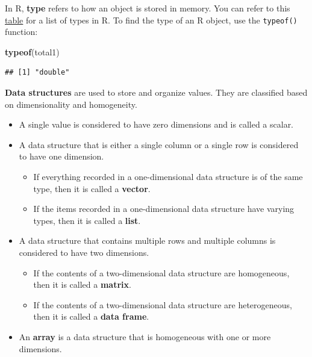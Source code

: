 \documentclass[
]{book}
\newenvironment{Shaded}{\begin{snugshade}}{\end{snugshade}}
\newcommand{\FunctionTok}[1]{\textcolor[rgb]{0.13,0.29,0.53}{\textbf{#1}}}
\newcommand{\NormalTok}[1]{#1}
\providecommand{\tightlist}{%
  \setlength{\itemsep}{0pt}\setlength{\parskip}{0pt}}
\theoremstyle{definition}
\theoremstyle{definition}
\theoremstyle{definition}
\theoremstyle{definition}
\theoremstyle{remark}
\begin{document}
In R, \textbf{type} refers to how an object is stored in memory. You can refer to this \href{https://cran.r-project.org/doc/manuals/r-patched/R-lang.html\#Objects}{table} for a list of types in R. To find the type of an R object, use the \texttt{typeof()} function:

\begin{Shaded}
\begin{Highlighting}[]
\FunctionTok{typeof}\NormalTok{(total1)}
\end{Highlighting}
\end{Shaded}

\begin{verbatim}
## [1] "double"
\end{verbatim}

\textbf{Data structures} are used to store and organize values. They are classified based on dimensionality and homogeneity.

\begin{itemize}
\tightlist
\item
  A single value is considered to have zero dimensions and is called a scalar.
\item
  A data structure that is either a single column or a single row is considered to have one dimension.

  \begin{itemize}
  \tightlist
  \item
    If everything recorded in a one-dimensional data structure is of the same type, then it is called a \textbf{vector}.
  \item
    If the items recorded in a one-dimensional data structure have varying types, then it is called a \textbf{list}.
  \end{itemize}
\item
  A data structure that contains multiple rows and multiple columns is considered to have two dimensions.

  \begin{itemize}
  \tightlist
  \item
    If the contents of a two-dimensional data structure are homogeneous, then it is called a \textbf{matrix}.
  \item
    If the contents of a two-dimensional data structure are heterogeneous, then it is called a \textbf{data frame}.
  \end{itemize}
\item
  An \textbf{array} is a data structure that is homogeneous with one or more dimensions.
\end{itemize}
\end{document}
